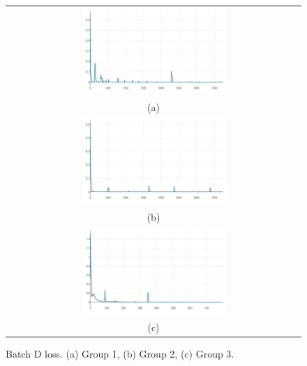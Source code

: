 \documentclass[10pt,twocolumn,letterpaper]{article}
\begin{document}
\begin{figure}%
\centering\begin{tabular}{c}
\includegraphics[width=0.5\textwidth]{fig13-a}\\
(a)\\[3ex]%
\includegraphics[width=0.5\textwidth]{fig13-b}\\
(b)\\[3ex]
\includegraphics[width=0.5\textwidth]{fig13-c}\\
(c)
\end{tabular}
\caption{Batch D loss. (a) Group 1, (b) Group 2, (c) Group 3.}%
\label{fig13}%
\end{figure}
\end{document}
